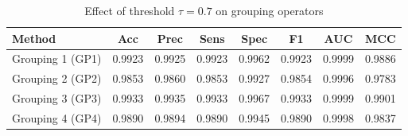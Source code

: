 \begin{table}[htbp]
\centering
\caption{Effect of threshold $\tau = 0.7$ on grouping operators}
\label{tab:t1_tau07}
\begin{tabular}{lccccccc}
\toprule
Method & Acc & Prec & Sens & Spec & F1 & AUC & MCC \\
\midrule
Grouping 1 (GP1) & 0.9923 & 0.9925 & 0.9923 & 0.9962 & 0.9923 & 0.9999 & 0.9886 \\
Grouping 2 (GP2) & 0.9853 & 0.9860 & 0.9853 & 0.9927 & 0.9854 & 0.9996 & 0.9783 \\
Grouping 3 (GP3) & 0.9933 & 0.9935 & 0.9933 & 0.9967 & 0.9933 & 0.9999 & 0.9901 \\
Grouping 4 (GP4) & 0.9890 & 0.9894 & 0.9890 & 0.9945 & 0.9890 & 0.9998 & 0.9837 \\
\bottomrule
\end{tabular}
\end{table}